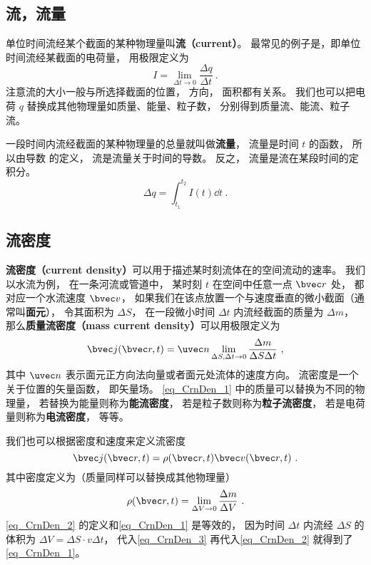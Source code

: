 

\subsection{流，流量}
单位时间流经某个截面的某种物理量叫\textbf{流（current）}。 最常见的例子是，即单位时间流经某截面的电荷量， 用极限定义为
\begin{equation}
I = \lim_{\Delta t \to 0} \frac{\Delta q}{\Delta t}~.
\end{equation}
注意流的大小一般与所选择截面的位置， 方向， 面积都有关系。 我们也可以把电荷 $q$ 替换成其他物理量如质量、能量、粒子数， 分别得到质量流、能流、粒子流。

一段时间内流经截面的某种物理量的总量就叫做\textbf{流量}， 流量是时间 $t$ 的函数， 所以由导数 的定义， 流是流量关于时间的导数。 反之， 流量是流在某段时间的定积分。
\begin{equation}
\Delta q = \int_{t_1}^{t_2} I(t) \dd{t}~.
\end{equation}

\subsection{流密度}
\textbf{流密度（current density）}可以用于描述某时刻流体在的空间流动的速率。 我们以水流为例， 在一条河流或管道中， 某时刻 $t$ 在空间中任意一点 $\bvec r$ 处， 都对应一个水流速度 $\bvec v$， 如果我们在该点放置一个与速度垂直的微小截面（通常叫\textbf{面元}）， 令其面积为 $\Delta S$， 在一段微小时间 $\Delta t$ 内流经截面的质量为 $\Delta m$， 那么\textbf{质量流密度（mass current density）}可以用极限定义为
\begin{equation}\label{eq_CrnDen_1}
\bvec j(\bvec r, t) = \uvec n \lim_{\Delta S, \Delta t \to 0} \frac{\Delta m}{\Delta S \Delta t}~,
\end{equation}
其中 $\uvec n$ 表示面元正方向法向量或者面元处流体的速度方向。 流密度是一个关于位置的矢量函数， 即矢量场。 \autoref{eq_CrnDen_1} 中的质量可以替换为不同的物理量， 若替换为能量则称为\textbf{能流密度}， 若是粒子数则称为\textbf{粒子流密度}， 若是电荷量则称为\textbf{电流密度}， 等等。 

我们也可以根据密度和速度来定义流密度
\begin{equation}\label{eq_CrnDen_2}
\bvec j(\bvec r, t) = \rho(\bvec r, t) \bvec v(\bvec r, t)~.
\end{equation}
其中密度定义为（质量同样可以替换成其他物理量）
\begin{equation}\label{eq_CrnDen_3}
\rho(\bvec r, t) = \lim_{\Delta V\to 0} \frac{\Delta m}{\Delta V}~.
\end{equation}
\autoref{eq_CrnDen_2} 的定义和\autoref{eq_CrnDen_1} 是等效的， 因为时间 $\Delta t$ 内流经 $\Delta S$ 的体积为 $\Delta V = \Delta S \cdot v  \Delta t$， 代入\autoref{eq_CrnDen_3} 再代入\autoref{eq_CrnDen_2} 就得到了\autoref{eq_CrnDen_1}。

